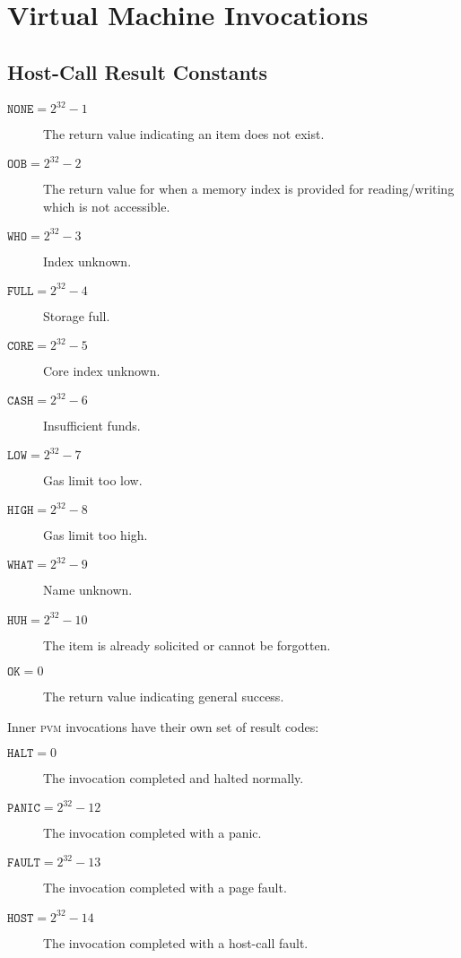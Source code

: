 
\section{Virtual Machine Invocations}\label{sec:virtualmachineinvocations}

\newcommand*{\pvm}{\mathbf{M}}

\subsection{Host-Call Result Constants}

\begin{description}
  \item[$\mathtt{NONE} = 2^{32} - 1$] The return value indicating an item does not exist.
  \item[$\mathtt{OOB} = 2^{32} - 2$] The return value for when a memory index is provided for reading/writing which is not accessible.
  \item[$\mathtt{WHO} = 2^{32} - 3$] Index unknown.
  \item[$\mathtt{FULL} = 2^{32} - 4$] Storage full.
  \item[$\mathtt{CORE} = 2^{32} - 5$] Core index unknown.
  \item[$\mathtt{CASH} = 2^{32} - 6$] Insufficient funds.
  \item[$\mathtt{LOW} = 2^{32} - 7$] Gas limit too low.
  \item[$\mathtt{HIGH} = 2^{32} - 8$] Gas limit too high.
  \item[$\mathtt{WHAT} = 2^{32} - 9$] Name unknown.
  \item[$\mathtt{HUH} = 2^{32} - 10$] The item is already solicited or cannot be forgotten.
  \item[$\mathtt{OK} = 0$] The return value indicating general success.
\end{description}

Inner \textsc{pvm} invocations have their own set of result codes:
\begin{description}
  \item[$\mathtt{HALT} = 0$] The invocation completed and halted normally.
  \item[$\mathtt{PANIC} = 2^{32} - 12$] The invocation completed with a panic.
  \item[$\mathtt{FAULT} = 2^{32} - 13$] The invocation completed with a page fault.
  \item[$\mathtt{HOST} = 2^{32} - 14$] The invocation completed with a host-call fault.
\end{description}

